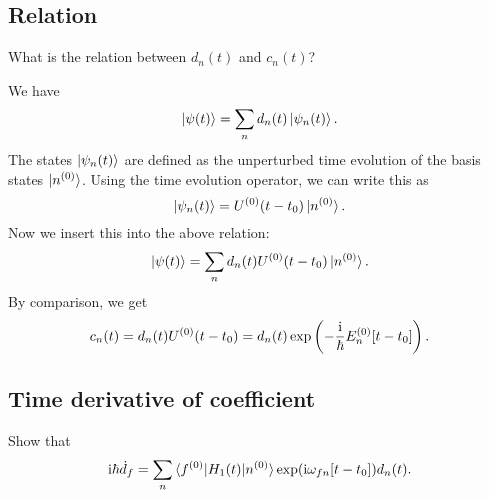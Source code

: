 \documentclass[11pt, english, fleqn, DIV=15, headinclude, BCOR=1.5cm]{scrartcl}
\begin{document}
\subsection{Relation}

\begin{problem}
    What is the relation between $d_n(t)$ and $c_n(t)$?
\end{problem}

We have
\[
    \ket{\psi(t)} = \sum_n d_n(t) \ket{\psi_n(t)}.
\]
The states $\ket{\psi_n(t)}$ are defined as the unperturbed time evolution of
the basis states $\ket{n^{(0)}}$. Using the time evolution operator, we can write
this as
\[
    \ket{\psi_n(t)} = U^{(0)}(t-t_0) \ket{n^{(0)}}.
\]
Now we insert this into the above relation:
\[
    \ket{\psi(t)} = \sum_n d_n(t) U^{(0)}(t-t_0) \ket{n^{(0)}}.
\]
By comparison, we get
\[
    c_n(t) = d_n(t) U^{(0)}(t-t_0) = d_n(t) \exp\left( -\frac{\mathrm i}\hbar E_n^{(0)}
    [t-t_0] \right).
\]

\subsection{Time derivative of coefficient}

\begin{problem}
    Show that
    \[
        \mathrm i \hbar \dot d_f = \sum_n \braket{f^{(0)} | H_1(t) | n^{(0)}} \exp(\mathrm i
        \omega_{fn} [t-t_0]) d_n(t).
    \]
\end{problem}
\end{document}
